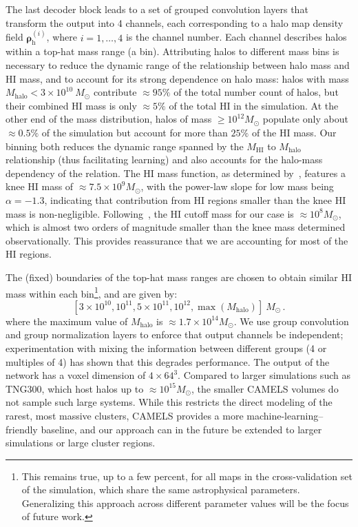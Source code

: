 The last decoder block leads to a set of grouped convolution layers that transform the output into 4 channels, each corresponding to a halo map density field $\boldsymbol{\rho}_{\text{h}}^{(i)}$, where $i=1,\dots,4$ is the channel number. Each channel describes halos within a top-hat mass range (a bin). Attributing halos to different mass bins is necessary to reduce the dynamic range of the relationship between halo mass and HI mass, and to account for its strong dependence on halo mass: halos with mass $M_{\text{halo}}<3\times10^{10}~M_\odot $ contribute $\approx 95 \%$ of the total number count of halos, but their combined HI mass is only $\approx 5 \%$ of the total HI in the simulation. At the other end of the mass distribution, halos of mass $\geq 10^{12} M_\odot$ populate only about $\approx 0.5 \%$ of the simulation but account for more than $ 25 \%$ of the HI mass. Our binning both reduces the dynamic range spanned by the $M_{\text{HI}}$ to $M_{\text{halo}}$ relationship (thus facilitating learning) and also accounts for the halo-mass dependency of the relation.
{The HI mass function, as determined by~\citet{Ma_2025_FASHI,Jones_ALFA}, features a knee HI mass of $\approx7.5\times10^9M_\odot$, with the power-law slope for low mass being $\alpha=-1.3$, indicating that contribution from HI regions smaller than the knee HI mass is non-negligible. Following~\citet{villaescusa-navarro_ingredients_2018}, the HI cutoff mass for our case is $\approx10^8M_\odot$, which is almost two orders of magnitude smaller than the knee mass determined observationally. This provides reassurance that we are accounting for most of the HI regions.}

The (fixed) boundaries of the top-hat mass ranges are chosen to obtain similar HI mass within each bin\footnote{This remains true, up to a few percent, for all maps in the cross-validation set of the simulation, which share the same astrophysical parameters. Generalizing this approach across different parameter values will be the focus of future work.},  and are given by:
\begin{equation}
\left[3 \times 10^{10}, 10^{11}, 5 \times 10^{11}, 10^{12}, \max \left( M_{\text{halo}} \right) \right] \ M_\odot \, .
\label{eq:halo_bins}
\end{equation}
{where the maximum value of $M_\text{halo}$ is $\approx 1.7\times10^{14}M_\odot$.}
We use group convolution and group normalization layers to enforce that output channels be independent; experimentation with mixing the information between different groups (4 or multiples of 4) has shown that this degrades performance. The output of the network has a voxel dimension of $4\times 64^3$. {Compared to larger simulations such as TNG300, which host halos up to $\approx 10^{15}M_\odot$, the smaller CAMELS volumes do not sample such large systems. While this restricts the direct modeling of the rarest, most massive clusters, CAMELS provides a more machine-learning–friendly baseline, and our approach can in the future be extended to larger simulations or large cluster regions. }

